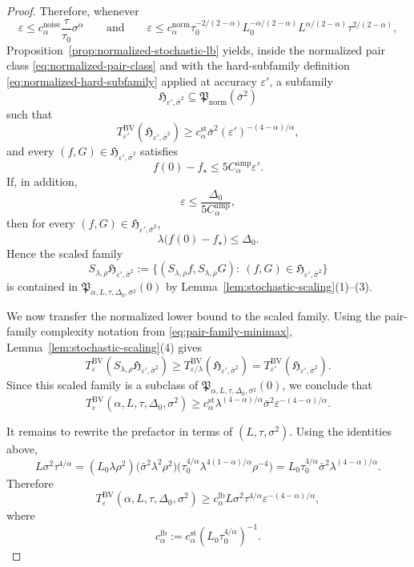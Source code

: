 \documentclass[11pt]{article}
\begin{document}
\begin{proof}
Therefore, whenever
\[
\varepsilon\le c_\alpha^{\mathrm{noise}}\frac{\tau}{\tau_0}\sigma^\alpha
\qquad\text{and}\qquad
\varepsilon\le
c_\alpha^{\mathrm{norm}}\tau_0^{-2/(2-\alpha)}L_0^{-\alpha/(2-\alpha)}
L^{\alpha/(2-\alpha)}\tau^{2/(2-\alpha)},
\]
Proposition~\ref{prop:normalized-stochastic-lb} yields, inside the normalized pair class
\eqref{eq:normalized-pair-class} and with the hard-subfamily definition
\eqref{eq:normalized-hard-subfamily} applied at accuracy \(\varepsilon'\), a subfamily
\[
\mathfrak H_{\varepsilon',\bar \sigma^2}\subseteq \mathfrak P_{\mathrm{norm}}(\bar \sigma^2)
\]
such that
\[
T_{\varepsilon'}^{\mathrm{BV}}(\mathfrak H_{\varepsilon',\bar \sigma^2})
\ge
c_\alpha^{\mathrm{st}}\bar \sigma^2(\varepsilon')^{-(4-\alpha)/\alpha},
\]
and every $(f,G)\in \mathfrak H_{\varepsilon',\bar \sigma^2}$ satisfies
\[
f(0)-f_\star\le 5C_\alpha^{\mathrm{amp}} \varepsilon'.
\]
If, in addition,
\[
\varepsilon\le \frac{\Delta_0}{5C_\alpha^{\mathrm{amp}}},
\]
then for every $(f,G)\in \mathfrak H_{\varepsilon',\bar \sigma^2}$,
\[
\lambda \bigl(f(0)-f_\star\bigr)\le \Delta_0.
\]
Hence the scaled family
\[
S_{\lambda,\rho}\mathfrak H_{\varepsilon',\bar \sigma^2}
:=
\{(S_{\lambda,\rho}f,S_{\lambda,\rho}G):\ (f,G)\in \mathfrak H_{\varepsilon',\bar \sigma^2}\}
\]
is contained in $\mathfrak P_{\alpha,L,\tau,\Delta_0,\sigma^2}(0)$ by Lemma~\ref{lem:stochastic-scaling}(1)--(3).

We now transfer the normalized lower bound to the scaled family.
Using the pair-family complexity notation from \eqref{eq:pair-family-minimax}, Lemma~\ref{lem:stochastic-scaling}(4)
gives
\[
T_\varepsilon^{\mathrm{BV}}(S_{\lambda,\rho}\mathfrak H_{\varepsilon',\bar \sigma^2})
\ge
T_{\varepsilon/\lambda}^{\mathrm{BV}}(\mathfrak H_{\varepsilon',\bar \sigma^2})
=
T_{\varepsilon'}^{\mathrm{BV}}(\mathfrak H_{\varepsilon',\bar \sigma^2}).
\]
Since this scaled family is a subclass of $\mathfrak P_{\alpha,L,\tau,\Delta_0,\sigma^2}(0)$, we conclude that
\[
T_\varepsilon^{\mathrm{BV}}(\alpha,L,\tau,\Delta_0,\sigma^2)
\ge
c_\alpha^{\mathrm{st}}\lambda^{(4-\alpha)/\alpha}\bar \sigma^2 \varepsilon^{-(4-\alpha)/\alpha}.
\]

It remains to rewrite the prefactor in terms of $(L,\tau,\sigma^2)$.
Using the identities above,
\[
L\sigma^2\tau^{4/\alpha}
=
(L_0\lambda \rho^2)\bigl(\bar \sigma^2 \lambda^2 \rho^2\bigr)\bigl(\tau_0^{4/\alpha}\lambda^{4(1-\alpha)/\alpha}\rho^{-4}\bigr)
=
L_0\tau_0^{4/\alpha}\bar \sigma^2 \lambda^{(4-\alpha)/\alpha}.
\]
Therefore
\[
T_\varepsilon^{\mathrm{BV}}(\alpha,L,\tau,\Delta_0,\sigma^2)
\ge
c_\alpha^{\mathrm{lb}} L\sigma^2\tau^{4/\alpha}\varepsilon^{-(4-\alpha)/\alpha},
\]
where
\[
c_\alpha^{\mathrm{lb}}:=c_\alpha^{\mathrm{st}}(L_0\tau_0^{4/\alpha})^{-1}.
\]


\end{proof}
\end{document}
